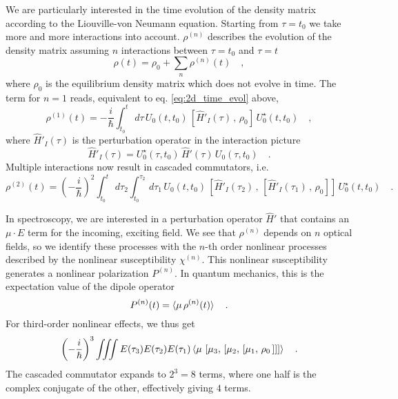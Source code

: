 We are particularly interested in the time evolution of the density matrix according to the Liouville-von Neumann equation. Starting from $\tau = t_0$ we take more and more interactions into account. $\rho^{(n)}$ describes the evolution of the density matrix assuming $n$ interactions between $\tau = t_0$ and $\tau = t$
\begin{equation}
\rho(t) = \rho_0  + \sum_n  \rho^{(n)} (t) \quad ,
\end{equation}
where $\rho_0$ is the equilibrium density matrix which does not evolve in time.
The term for $n=1$ reads, equivalent to eq.  \ref{eq:2d_time_evol}  above,
\begin{equation}
 \rho^{(1)} (t) = - \frac{i}{\hbar} \int_{t_0}^t \, d\tau \, U_0(t, t_0) \, \left[ \hat{H}'_I(\tau) \, , \, \rho_0 \right] \, U_0^\star (t, t_0) \quad ,
\end{equation}
where $\hat{H}'_I(\tau) $ is the perturbation operator in the interaction picture
\begin{equation}
\hat{H}'_I(\tau) =  U_0^\star (\tau , t_0) \, \hat{H}'(\tau) \, U_0 (\tau , t_0) \quad .
\end{equation}
Multiple interactions now result in cascaded commutators, i.e.
\begin{equation}
 \rho^{(2)} (t) = \left(- \frac{i}{\hbar}\right)^2   \int_{t_0}^t \, d\tau_2   \int_{t_0}^{\tau_2} \, d\tau_1 \, U_0(t, t_0) \, \left[ \hat{H}'_I(\tau_2) \, , \, \left[ \hat{H}'_I(\tau_1) \, , \, \rho_0 \right] \right] \, U_0^\star (t, t_0) \quad .
\end{equation}

In spectroscopy, we are interested in a perturbation operator $\hat{H}'$ that contains an $\mu \cdot E$ term for the incoming, exciting field. We see that $\rho^{(n)}$ depends on $n$ optical fields, so we identify these processes with the $n$-th order nonlinear processes described by the nonlinear susceptibility $\chi^{(n)}$. This nonlinear susceptibility generates a nonlinear polarization $P^{(n)}$. In quantum mechanics, this is the expectation value of the dipole operator 
\begin{equation}
P^{(n)} (t) = \braket{ \mu \, \rho^{(n)}(t) } \quad .
\end{equation}
For third-order nonlinear effects, we thus get
\begin{equation}
 \left(- \frac{i}{\hbar}\right)^3   \iiint E(\tau_3) E(\tau_2) E(\tau_1)
 \braket{ \mu \, 
  \left[ \mu_3 , \, \left[ \mu_2 , \, \left[ \mu_1 , \, \rho_0 \, \right] \right]  \right] } \quad .
  \label{eq:2d-p3-commutator}
\end{equation}
The cascaded commutator expands to $2^3=8$ terms, where one half is the complex conjugate of the other, effectively giving $4$ terms.

